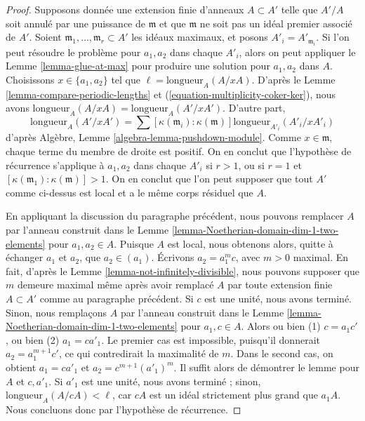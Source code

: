 \begin{proof}
\medskip\noindent
Supposons donnée une extension finie d'anneaux $A \subset A'$ telle que
$A'/A$ soit annulé par une puissance de $\mathfrak m$ et que
$\mathfrak m$ ne soit pas un idéal premier associé de $A'$.
Soient $\mathfrak m_1, \ldots, \mathfrak m_r \subset A'$
les idéaux maximaux, et posons $A'_i = A'_{\mathfrak m_i}$.
Si l'on peut résoudre le problème pour $a_1, a_2$ dans chaque $A'_i$,
alors on peut appliquer le Lemme \ref{lemma-glue-at-max}
pour produire une solution pour $a_1, a_2$ dans $A$.
Choisissons $x \in \{a_1, a_2\}$ tel que $\ell = \text{longueur}_A(A/xA)$.
D'après le Lemme \ref{lemma-compare-periodic-lengths} 
et (\ref{equation-multiplicity-coker-ker}),
nous avons $\text{longueur}_A(A/xA) = \text{longueur}_A(A'/xA')$.
D'autre part,
$$
\text{longueur}_A(A'/xA') =
\sum [\kappa(\mathfrak m_i) : \kappa(\mathfrak m)]
\text{longueur}_{A'_i}(A'_i/xA'_i)
$$
d'après Algèbre, Lemme \ref{algebra-lemma-pushdown-module}.
Comme $x \in \mathfrak m$, chaque terme du membre de droite
est positif. On en conclut que l'hypothèse de récurrence s'applique
à $a_1, a_2$ dans chaque $A'_i$ si $r > 1$, ou si $r = 1$ et
$[\kappa(\mathfrak m_1) : \kappa(\mathfrak m)] > 1$.
On en conclut que l'on peut supposer que tout $A'$ comme ci-dessus est local et a
le même corps résiduel que $A$.

\medskip\noindent
En appliquant la discussion du paragraphe précédent,
nous pouvons remplacer $A$ par l'anneau construit dans le
Lemme \ref{lemma-Noetherian-domain-dim-1-two-elements}
pour $a_1, a_2 \in A$. Puisque $A$ est local, nous obtenons alors,
quitte à échanger $a_1$ et $a_2$, que $a_2 \in (a_1)$.
Écrivons $a_2 = a_1^m c$, avec $m > 0$ maximal. En fait, d'après le
Lemme \ref{lemma-not-infinitely-divisible},
nous pouvons supposer que $m$ demeure maximal même après avoir remplacé $A$
par toute extension finie $A \subset A'$ comme au paragraphe précédent.
Si $c$ est une unité, nous avons terminé. Sinon, nous remplaçons
$A$ par l'anneau construit dans le
Lemme \ref{lemma-Noetherian-domain-dim-1-two-elements}
pour $a_1, c \in A$. Alors ou bien (1) $c = a_1 c'$, ou bien
(2) $a_1 = c a'_1$. Le premier cas est impossible, puisqu'il
donnerait $a_2 = a_1^{m + 1} c'$, ce qui contredirait la
maximalité de $m$. Dans le second cas, on obtient
$a_1 = c a'_1$ et $a_2 = c^{m + 1} (a'_1)^m$.
Il suffit alors de démontrer le lemme pour $A$ et $c, a'_1$.
Si $a'_1$ est une unité, nous avons terminé ; sinon,
$\text{longueur}_A(A/cA) < \ell$, car $cA$ est un idéal strictement
plus grand que $a_1A$. Nous concluons donc par l'hypothèse de récurrence.
\end{proof}






